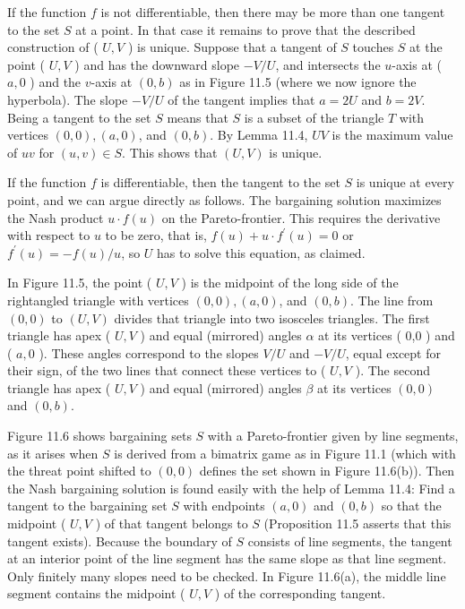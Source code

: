 \documentclass[12pt]{article}
\begin{document}
If the function $f$ is not differentiable, then there may be more than one tangent to the set $S$ at a point. In that case it remains to prove that the described construction of ( $U, V$ ) is unique. Suppose that a tangent of $S$ touches $S$ at the point ( $U, V$ ) and has the downward slope $-V / U$, and intersects the $u$-axis at ( $a, 0$ ) and the $v$-axis at $(0, b)$ as in Figure 11.5 (where we now ignore the hyperbola). The slope $-V / U$ of the tangent implies that $a=2 U$ and $b=2 V$. Being a tangent to the set $S$ means that $S$ is a subset of the triangle $T$ with vertices $(0,0),(a, 0)$, and $(0, b)$. By Lemma 11.4, $U V$ is the maximum value of $u v$ for $(u, v) \in S$. This shows that $(U, V)$ is unique.

If the function $f$ is differentiable, then the tangent to the set $S$ is unique at every point, and we can argue directly as follows. The bargaining solution maximizes the Nash product $u \cdot f(u)$ on the Pareto-frontier. This requires the derivative with respect to $u$ to be zero, that is, $f(u)+u \cdot f^{\prime}(u)=0$ or $f^{\prime}(u)=-f(u) / u$, so $U$ has to solve this equation, as claimed.

In Figure 11.5, the point ( $U, V$ ) is the midpoint of the long side of the rightangled triangle with vertices $(0,0),(a, 0)$, and $(0, b)$. The line from $(0,0)$ to $(U, V)$ divides that triangle into two isosceles triangles. The first triangle has apex ( $U, V$ ) and equal (mirrored) angles $\alpha$ at its vertices ( 0,0 ) and ( $a, 0$ ). These angles correspond to the slopes $V / U$ and $-V / U$, equal except for their sign, of the two lines that connect these vertices to ( $U, V$ ). The second triangle has apex ( $U, V$ ) and equal (mirrored) angles $\beta$ at its vertices $(0,0)$ and $(0, b)$.

Figure 11.6 shows bargaining sets $S$ with a Pareto-frontier given by line segments, as it arises when $S$ is derived from a bimatrix game as in Figure 11.1 (which with the threat point shifted to $(0,0)$ defines the set shown in Figure 11.6(b)). Then the Nash bargaining solution is found easily with the help of Lemma 11.4: Find a tangent to the bargaining set $S$ with endpoints $(a, 0)$ and $(0, b)$ so that the midpoint ( $U, V$ ) of that tangent belongs to $S$ (Proposition 11.5 asserts that this tangent exists). Because the boundary of $S$ consists of line segments, the tangent at an interior point of the line segment has the same slope as that line segment. Only finitely many slopes need to be checked. In Figure 11.6(a), the middle line segment contains the midpoint ( $U, V$ ) of the corresponding tangent.
\end{document}
